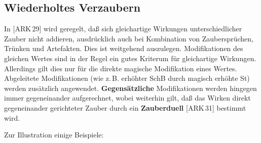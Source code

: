 \documentclass[10pt,a4paper,germanpar]{article}
\begin{document}
\subsection{Wiederholtes Verzaubern}

In [ARK\,29] wird geregelt, daß sich gleichartige Wirkungen
unterschiedlicher Zauber nicht addieren, ausdrücklich auch bei
Kombination von Zaubersprüchen, Trünken und Artefakten. Dies ist
weitgehend auszulegen. Modifikationen des gleichen Wertes sind in der
Regel ein gutes Kriterum für gleichartige Wirkungen. Allerdings gilt
dies nur für die direkte magische Modifikation eines
Wertes. Abgeleitete Modifikationen (wie z.\,B. erhöhter SchB durch
magisch erhöhte St) werden zusätzlich
angewendet. \textbf{Gegensätzliche} Modifikationen werden hingegen
immer gegeneinander aufgerechnet, wobei weiterhin gilt, daß das Wirken
direkt gegeneinander gerichteter Zauber durch ein \textbf{Zauberduell}
[ARK\,31] bestimmt wird.

Zur Illustration einige Beispiele:
\end{document}
